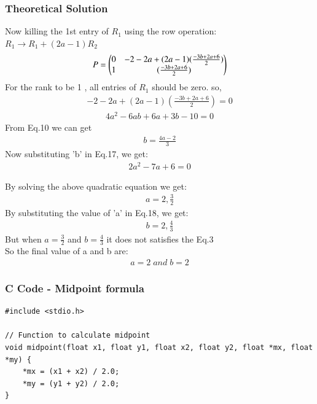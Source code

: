 \documentclass{beamer}
\begin{document}
\begin{frame}
\frametitle{Theoretical Solution}
Now killing the 1st entry of $R_1$ using the row operation:\\
$R_1\longrightarrow R_1+(2a-1)R_2$
\begin{align}
    P=\myvec{0&-2-2a+(2a-1)(\frac{-3b+2a+6}{2})\\1&(\frac{-3b+2a+6}{2})}
\end{align}
For the rank to be 1 , all entries of $R_1$ should be zero. so,
\begin{align}
    -2-2a+(2a-1)(\frac{-3b+2a+6}{2}) = 0
\end{align}
\begin{align}
    4a^2-6ab+6a+3b-10=0
\end{align}
From Eq.10 we can get
\begin{align}
    b=\frac{4a-2}{3}
\end{align}
Now substituting 'b' in Eq.17, we get:
\begin{align}
2a^2-7a+6=0
\end{align}

\end{frame}
\begin{frame}
By solving the above quadratic equation we get:
\begin{align}
a=2,\frac{3}{2}
\end{align}
By substituting the value of 'a' in Eq.18, we get:
\begin{align}
b=2,\frac{4}{3}
\end{align}
But when $a=\frac{3}{2}$ and $b=\frac{4}{3}$ it does not satisfies the Eq.3\\
So the final value of a and b are:
\begin{align}
    a=2\;and\;b=2
\end{align}
\end{frame}


\begin{frame}[fragile]
    \frametitle{C Code - Midpoint formula }

    \begin{lstlisting}
#include <stdio.h>

// Function to calculate midpoint
void midpoint(float x1, float y1, float x2, float y2, float *mx, float *my) {
    *mx = (x1 + x2) / 2.0;
    *my = (y1 + y2) / 2.0;
}


    \end{lstlisting}
\end{frame}
\end{document}
